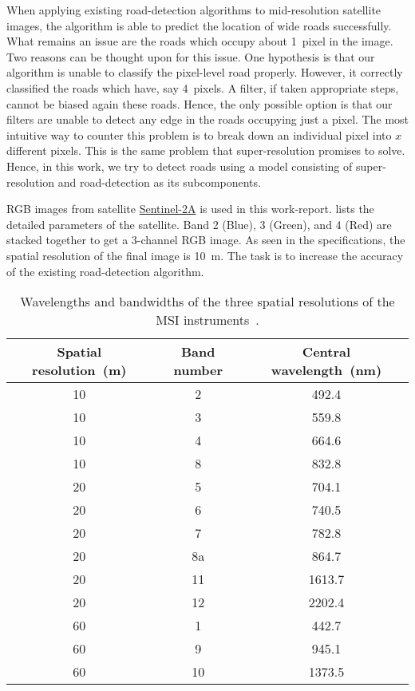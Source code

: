 When applying existing road-detection algorithms to mid-resolution satellite images, the algorithm is able to predict the location of wide roads successfully. What remains an issue are the roads which occupy about 1~pixel in the image. Two reasons can be thought upon for this issue. One hypothesis is that our algorithm is unable to classify the pixel-level road properly. However, it correctly classified the roads which have, say 4~pixels. A filter, if taken appropriate steps, cannot be biased again these roads. Hence, the only possible option is that our filters are unable to detect any edge in the roads occupying just a pixel. The most intuitive way to counter this problem is to break down an individual pixel into $x$ different pixels. This is the same problem that super-resolution promises to solve. Hence, in this work, we try to detect roads using a model consisting of super-resolution and road-detection as its subcomponents.


RGB images from satellite \href{https://sentinel.esa.int/web/sentinel/missions/sentinel-2}{Sentinel-2A} is used in this work-report.  lists the detailed parameters of the satellite. Band 2 (Blue), 3 (Green), and 4 (Red) are stacked together to get a 3-channel RGB image. As seen in the specifications, the spatial resolution of the final image is 10~m. The task is to increase the accuracy of the existing road-detection algorithm.

\begin{table}[h!]
  \centering
  \begin{tabular}{ |c|c|c| }
    \hline
    Spatial resolution~(m) & Band number & Central wavelength~(nm) \\
    \hline
    10&2&492.4 \\
    10&3&559.8 \\
    10&4&664.6 \\
    10&8&832.8 \\
    20&5&704.1 \\
    20&6&740.5 \\
    20&7&782.8 \\
    20&8a&864.7 \\
    20&11&1613.7 \\
    20&12&2202.4 \\
    60&1&442.7 \\
    60&9&945.1 \\
    60&10&1373.5 \\
    \hline
  \end{tabular}
  \caption[Wavelengths and bandwidths of the three spatial resolutions of the MSI instruments]{Wavelengths and bandwidths of the three spatial resolutions of the MSI instruments~\cite{sentinelSpecifications}.}
  \label{tab:sentinel-resolution}
\end{table}

